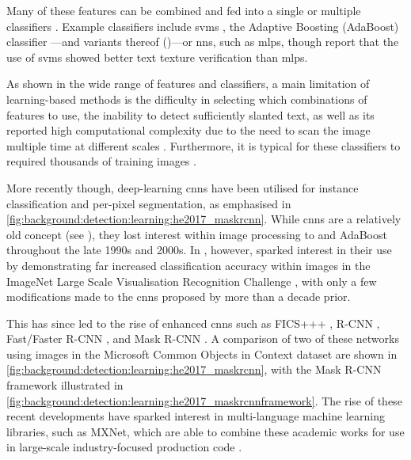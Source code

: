 Many of these features can be combined and fed into a single or multiple classifiers \citep{Pan:2010cj, Hanif:2008un, Hanif:2009tm, Gllavata:2004vq, Ye:2005wu, Wang:2009il, Tu:2003tg}. Example classifiers include \glspl{svm} \citep{Cortes:1995wa,Burges:1998wd,Vapnik:1999vu}, the Adaptive Boosting (AdaBoost) classifier \citep{Freund:1996uc}---and variants thereof (\citep{Friedman:2000jg,Hanif:2009tm,Sochman:2005dn})---or \glspl{nn}, such as \glspl{mlp}, though \citet{Chen:2004tja} report that the use of \glspl{svm} showed better text texture verification than \glspl{mlp}. 

As shown in the wide range of features and classifiers, a main limitation of learning-based methods is the difficulty in selecting which combinations of features to use, the inability to detect sufficiently slanted text, as well as its reported high computational complexity due to the need to scan the image multiple time at different scales \citep{Li:2012wd, Epshtein:2010tj}. Furthermore, it is typical for these classifiers to required thousands of training images \cite{Chen:2004ux}.

More recently though, deep-learning \glspl{cnn} have been utilised for instance classification and per-pixel segmentation, as emphasised in \cref{fig:background:detection:learning:he2017_maskrcnn}. While \glspl{cnn} are a relatively old concept (see \citet{Lecun:1998hy}), they lost interest within image processing to  and AdaBoost throughout the late 1990s and 2000s. In \citeyear{Krizhevsky:2012wl}, however, \citet{Krizhevsky:2012wl} sparked interest in their use by demonstrating far increased classification accuracy within images in the ImageNet Large Scale Visualisation Recognition Challenge \citep{JiaDeng:2009dl}, with only a few modifications made to the \glspl{cnn} proposed by \citeauthor{Lecun:1998hy} more than a decade prior. 

This has since led to the rise of enhanced \glspl{cnn} such as FICS+++ \citep{Li:2016uj}, R-CNN \citep{Girshick:2014jx}, Fast/Faster R-CNN \citep{Girshick:2015vr, Ren:2017ug}, and Mask R-CNN \citep{He:2017ud}. A comparison of two of these networks using images in the Microsoft Common Objects in Context \cite{Lin:2014vm} dataset are shown in \cref{fig:background:detection:learning:he2017_maskrcnn}, with the Mask R-CNN framework illustrated in \cref{fig:background:detection:learning:he2017_maskrcnnframework}. The rise of these recent developments have sparked interest in multi-language machine learning libraries, such as MXNet, which are able to combine these academic works for use in large-scale industry-focused production code \cite{Chen:2015vh}.

